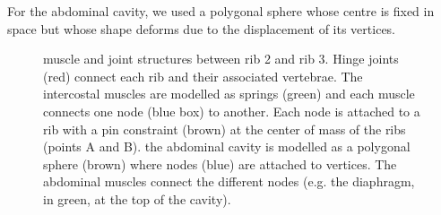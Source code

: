 For the abdominal cavity, we used a polygonal sphere whose centre is fixed in space but whose shape deforms due to the displacement of its vertices.

\begin{figure}
\centering
{}
\caption[Comparison with the simulated spine]{ muscle and joint structures between rib 2 and rib 3. Hinge joints (red) connect each rib and their associated vertebrae. The intercostal muscles are modelled as springs (green) and each muscle connects one node (blue box) to another. Each node is attached to a rib with a pin constraint (brown) at the center of mass of the ribs (points A and B).  the abdominal cavity is modelled as a polygonal sphere (brown) where nodes (blue) are attached to vertices. The abdominal muscles connect the different nodes (e.g. the diaphragm, in green, at the top of the cavity).}
\label{fig:mus_joints}
\end{figure}

